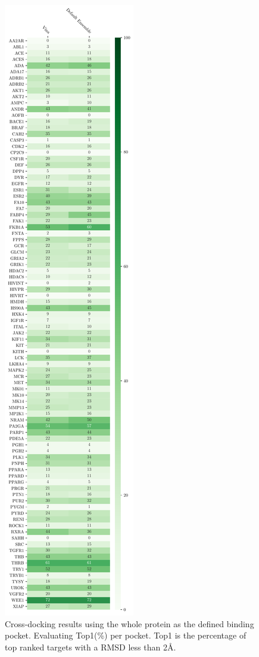 \documentclass[journal=jcisd8,manuscript=article]{achemso}
\begin{document}
\begin{figure}
    \centering
    \includegraphics[height=0.9\textheight]{figures/crossdocking/whole_ptn_top1_per_pocket.pdf}
    \caption{Cross-docking results using the whole protein as the defined binding pocket. Evaluating Top1(\%) per pocket. Top1 is the percentage of top ranked targets with a RMSD less than 2{\AA}.}
    \label{fig:WholeProtein_PerPock}
\end{figure}
\end{document}

